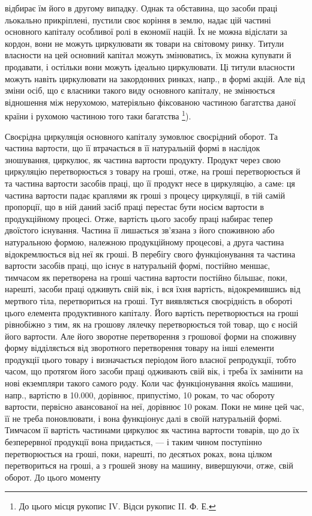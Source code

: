 \parcont{}  %
відбирає їм його в другому випадку. Однак та обставина, що засоби праці льокально прикріплені,
пустили своє коріння в землю, надає цій частині основного капіталу особливої ролі в економії націй.
Їх не можна відіслати за кордон, вони не можуть циркулювати як товари на світовому ринку. Титули
власности на цей основний капітал можуть змінюватись, їх можна купувати й продавати, і остільки вони
можуть ідеально
циркулювати. Ці титули власности можуть навіть циркулювати на закордонних ринках, напр., в формі
акцій. Але від зміни осіб, що є власники такого виду основного капіталу, не змінюється відношення
між нерухомою, матеріяльно фіксованою частиною багатства даної країни і рухомою частиною того таки
багатства \footnote{До цього місця рукопис IV. Відси рукопис II. Ф. Е.}).

Своєрідна циркуляція основного капіталу зумовлює своєрідний оборот. Та частина вартости, що її
втрачається в її натуральній формі в наслідок зношування, циркулює, як частина вартости продукту.
Продукт через свою циркуляцію перетворюється з товару на гроші, отже, на гроші перетворюється й та
частина вартости засобів праці, що її продукт несе в циркуляцію, а саме: ця частина вартости падає
краплями як гроші з процесу циркуляції, в тій самій пропорції, що в ній даний засіб праці перестає
бути носієм вартости в продукційному процесі. Отже, вартість цього засобу праці набирає тепер
двоїстого існування. Частина її лишається зв’язана з його споживною або натуральною формою, належною
продукційному процесові, а друга частина відокремлюється від неї як гроші. В перебігу свого
функціонування та частина вартости засобів праці, що існує в натуральній формі, постійно меншає,
тимчасом як перетворена на гроші частина вартости постійно більшає, поки, нарешті, засоби праці
одживуть свій вік, і вся їхня вартість, відокремившись від мертвого тіла, перетвориться на гроші.
Тут виявляється своєрідність в обороті цього елемента продуктивного капіталу. Його вартість
перетворюється на гроші рівнобіжно з тим, як на грошову лялечку перетворюється той товар, що є носій
його вартости. Але його зворотне перетворення з грошової форми на споживну форму відділяється від
зворотного перетворення товару на інші елементи продукції цього товару і визначається періодом його
власної репродукції, тобто часом, що протягом його засоби праці одживають свій вік, і треба їх
замінити на нові екземпляри такого самого роду. Коли час функціонування якоїсь машини, напр.,
вартістю в 10.000, дорівнює, припустімо, 10 рокам, то час обороту вартости, первісно
авансованої на неї, дорівнює 10 рокам. Поки не мине цей час, її не треба поновлювати, і вона
функціонує далі в своїй натуральній формі. Тимчасом її вартість частинами циркулює як частина
вартости товарів, що до їх безперервної продукції вона придається, — і таким чином поступінно
перетворюється на гроші, поки, нарешті, по десятьох роках, вона цілком перетвориться на гроші, а з
грошей знову на машину, вивершуючи, отже, свій оборот. До цього моменту
\parbreak{}  %
